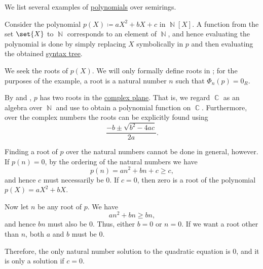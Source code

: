 \begin{example}\label{ex:def:polynomial_semiring}
  We list several examples of \hyperref[def:polynomial_semiring]{polynomials} over semirings.
  \begin{thmenum}
     Consider the polynomial \( p(X) \coloneqq aX^2 + bX + c \) in \( \BbbN[X] \). A function from the set \( \set{ X } \) to \( \BbbN \) corresponds to an element of \( \BbbN \), and hence evaluating the polynomial is done by simply replacing \( X \) symbolically in \( p \) and then evaluating the obtained \hyperref[rem:binary_operation_syntax_trees]{syntax tree}.

    We seek the roots of \( p(X) \). We will only formally define roots in ; for the purposes of the example, a root is a natural number \( n \) such that \( \Phi_n(p) = 0_R \).

    By  and , \( p \) has two roots in the \hyperref[def:set_of_complex_numbers]{complex plane}. That is, we regard \( \BbbC \) as an algebra over \( \BbbN \) and use  to obtain a polynomial function on \( \BbbC \). Furthermore, over the complex numbers the roots can be explicitly found using
    \begin{equation*}
      \frac {-b \pm \sqrt{b^2 - 4ac}} {2a}.
    \end{equation*}

    Finding a root of \( p \) over the natural numbers cannot be done in general, however. If \( p(n) = 0 \), by the ordering of the natural numbers we have
    \begin{equation*}
      p(n) = an^2 + bn + c \geq c,
    \end{equation*}
    and hence \( c \) must necessarily be \( 0 \). If \( c = 0 \), then zero is a root of the polynomial \( p(X) = aX^2 + bX \).

    Now let \( n \) be any root of \( p \). We have
    \begin{equation*}
      an^2 + bn \geq bn,
    \end{equation*}
    and hence \( bn \) must also be \( 0 \). Thus, either \( b = 0 \) or \( n = 0 \). If we want a root other than \( n \), both \( a \) and \( b \) must be \( 0 \).

    Therefore, the only natural number solution to the quadratic equation is \( 0 \), and it is only a solution if \( c = 0 \).


\end{thmenum}
\end{example}
